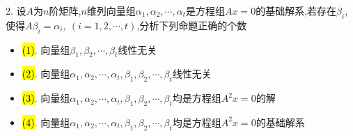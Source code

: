 2. 设$A$为$n$阶矩阵,$n$维列向量组$\alpha_{1},\alpha_{2},\cdots,\alpha_{t}$是方程组$Ax=0$的基础解系,若存在$\beta_{i}$,使得$A\beta_{i}=\alpha_{i}, \ (i=1,2,\cdots,t)$,分析下列命题正确的个数
\begin{itemize}
	\item \hl{(1)}. 向量组$\beta_{1},\beta_{2},\cdots,\beta_{t}$线性无关
	\item \hl{(2)}. 向量组$\alpha_{1},\alpha_{2},\cdots,\alpha_{t},\beta_{1},\beta_{2},\cdots,\beta_{t}$线性无关
	\item \hl{(3)}. 向量组$\alpha_{1},\alpha_{2},\cdots,\alpha_{t},\beta_{1},\beta_{2},\cdots,\beta_{t}$均是方程组$A^2x=0$的解
	\item \hl{(4)}. 向量组$\alpha_{1},\alpha_{2},\cdots,\alpha_{t},\beta_{1},\beta_{2},\cdots,\beta_{t}$均是方程组$A^2x=0$的基础解系
\end{itemize}
